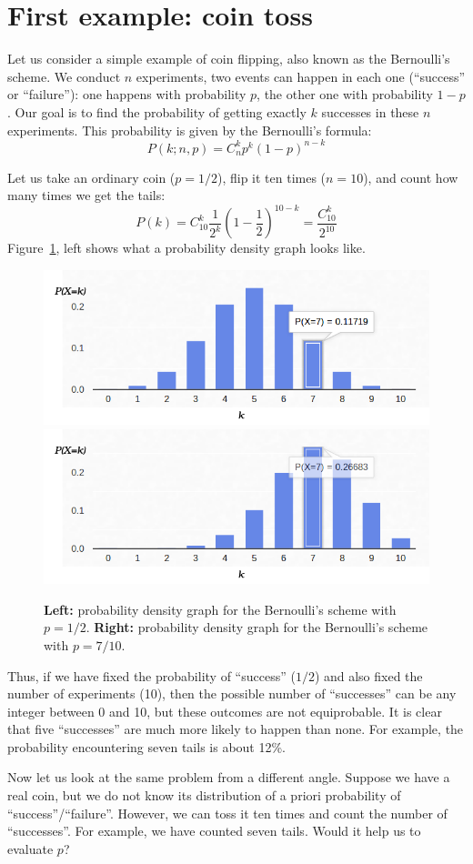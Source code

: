 \documentclass[notitlepage,oneside]{book}
\begin{document}
\section{First example: coin toss}
\label{sec:cointoss}
Let us consider a simple example of coin flipping, also known as the Bernoulli's scheme. 
We conduct $n$ experiments, two events can happen in each one (``success'' or ``failure''): 
one happens with probability $p$, the other one with probability $1-p$. 
Our goal is to find the probability of getting exactly $k$ successes in these $n$ experiments. 
This probability is given by the Bernoulli's formula:
$$
P(k;n,p) = C_n^k p^k (1-p)^{n-k}
$$

Let us take an ordinary coin ($p=1/2$), flip it ten times ($n=10$), and count how many times we get the tails:
$$P(k) = C_{10}^k \frac{1}{2^k}\left(1-\frac{1}{2}\right)^{10-k} = \frac{C_{10}^k}{2^{10}}$$
Figure~\ref{fig:binomial}, left shows what a probability density graph looks like.

\begin{figure}[htb!]
\centering
\includegraphics[width=.48\columnwidth]{img/binomial-05.png}
\includegraphics[width=.48\columnwidth]{img/binomial-07.png}
\caption{\textbf{Left:} probability density graph for the Bernoulli's scheme with $p=1/2$. \textbf{Right:} probability density graph for the Bernoulli's scheme with $p=7/10$.}
\label{fig:binomial}
\end{figure}

Thus, if we have fixed the probability of ``success'' ($1/2$) and also fixed the number of experiments (10), 
then the possible number of ``successes'' can be any integer between 0 and 10, but these outcomes are not equiprobable. 
It is clear that five ``successes'' are much more likely to happen than none. For example, the probability encountering seven tails is about 12\%.

Now let us look at the same problem from a different angle. 
Suppose we have a real coin, but we do not know its distribution of a priori probability of ``success''/``failure''. 
However, we can toss it ten times and count the number of ``successes''. 
For example, we have counted seven tails.
Would it help us to evaluate $p$?
\end{document}
